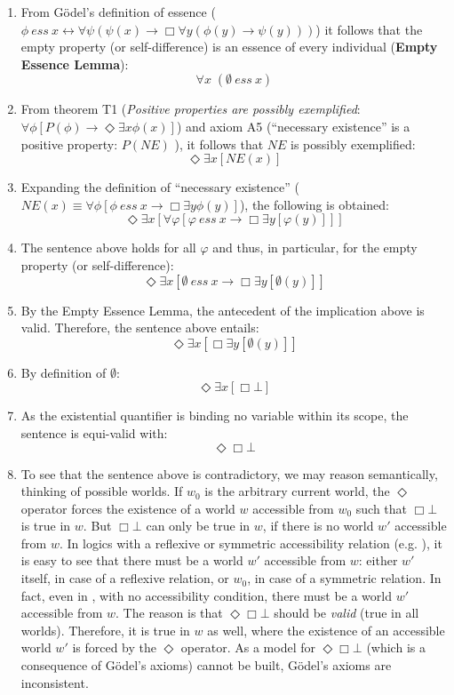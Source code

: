 \documentclass{article}
\newcommand{\imp}{{\rightarrow}}
\newcommand{\biimp}{\leftrightarrow}
\newcommand{\allq}{\forall}
\newcommand{\exq}{\exists}
\newcommand{\Dia}{\Diamond} %
\newcommand{\NE}{\mathit{NE}}
\newcommand{\ess}[2]{#1\ \mathit{ess}\ #2}
\newcommand{\nec}{\Box}
\newcommand{\pos}{\Dia}
\begin{document}
\begin{enumerate}
\item From G\"odel's definition of essence 
(${\ess{\phi}{x} \biimp {\allq \psi} (\psi(x)
\imp {\nec} \allq y (\phi(y) \imp \psi(y)))}$) it follows that the
empty property (or self-difference) is an essence of every individual (\textbf{Empty Essence Lemma}): 
$$\allq x\; (\ess{\emptyset}{x})$$

\item From theorem T1 (\textit{Positive properties are possibly
  exemplified}: ${\allq \phi} [P(\phi) \imp {\pos}  \exq x
  \phi(x)]$) and axiom A5 (``necessary existence'' is a positive property: $P(\NE)$ ), it follows that $\NE$ is possibly exemplified:
  $$
  \pos \exq x [\NE(x)]
  $$
 
\item Expanding the definition of ``necessary existence''
  (${\NE(x) \equiv \allq \phi [\ess{\phi}{x} \imp \nec \exq y
    \phi(y)]}$), the following is obtained:
  $$
  \pos \exq x [\allq \varphi [ \ess{\varphi}{x} \imp \nec \exq y [\varphi(y)] ] ]
  $$

\item The sentence above holds for all $\varphi$ and thus, in
  particular, for the empty property (or self-difference):
$$
\pos \exq x [ \ess{\emptyset}{x} \imp \nec \exq y [\emptyset(y)] ]
$$

\item By the Empty Essence Lemma, the antecedent of the implication above is valid. Therefore, the sentence above entails:
$$
\pos \exq x [ \nec \exq y [\emptyset(y)] ]
$$ 

\item By definition of $\emptyset$: 
$$
\pos \exq x [ \nec \bot ]
$$

\item As the existential quantifier is binding no variable within its scope, the sentence is equi-valid with:
$$\pos \nec \bot $$

\item To see that the sentence above is contradictory, we may reason semantically, thinking of possible worlds. If $w_0$ is the arbitrary current world, the $\pos$ operator forces the existence of a world $w$ accessible from $w_0$ such that $\nec \bot$ is true in $w$. But $\nec \bot$ can only be true in $w$, if there is no world $w'$ accessible from $w$. In logics with a reflexive or symmetric accessibility relation (e.g. \KB), it is easy to see that there must be a world $w'$ accessible from $w$: either $w'$ itself, in case of a reflexive relation, or $w_0$, in case of a symmetric relation. In fact, even in \K, with no accessibility condition, there must be a world $w'$ accessible from $w$. The reason is that $\pos \nec \bot$ should be \emph{valid} (true in all worlds). Therefore, it is true in $w$ as well, where the existence of an accessible world $w'$ is forced by the $\pos$ operator. As a model for $\pos \nec \bot$ (which is a consequence of G\"odel's axioms) cannot be built, G\"odel's axioms are inconsistent.
\end{enumerate}
\end{document}
